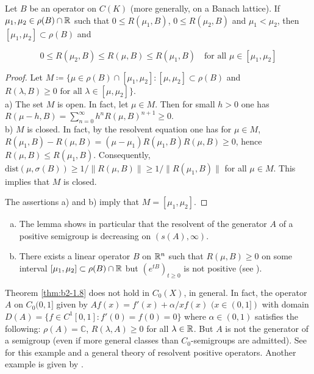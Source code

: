 \begin{lemma}\label{lem:b2-1.9}
Let $B$ be an operator on $C(K)$ (more generally, on a Banach lattice).
If $\mu_{1}, \mu_{2} \in \rho(B) \cap \mathbb{R}$ such that $0 \leq R(\mu_{1},B)$, $0 \leq R(\mu_{2},B)$ and $\mu_{1} < \mu_{2}$, then $[\mu_{1},\mu_{2}] \subset \rho(B)$ and

\[
    0 \leq R(\mu_{2},B) \leq R(\mu,B) \leq R(\mu_{1},B) \quad \text{for all } \mu \in [\mu_{1},\mu_{2}]
\]
\end{lemma}
\begin{proof}
Let $M \coloneqq \{\mu \in \rho(B) \cap [\mu_{1},\mu_{2}] \colon [\mu,\mu_{2}] \subset \rho(B)$  and $R(\lambda,B) \geq 0 \text{ for all } \lambda \in [\mu,\mu_{2}]\}$.
\\
a) The set $M$ is open.
In fact, let $\mu \in M$.
Then for small $h > 0$ one has $R(\mu-h,B) = \sum_{n=0}^{\infty} h^{n}R(\mu,B)^{n+1} \geq 0$.
\\
b) $M$ is closed.
In fact, by the resolvent equation one has for $\mu \in M$, $R(\mu_{1},B) - R(\mu,B) = (\mu - \mu_{1})R(\mu_{1},B)R(\mu,B) \geq 0$, hence $R(\mu,B) \leq R(\mu_{1},B)$.
Consequently, $\text{dist}(\mu,\sigma(B)) \geq 1/\|R(\mu,B)\| \geq 1/\|R(\mu_{1},B)\|$ for all $\mu \in M$.
This implies that $M$ is closed.

The assertions a) and b) imply that $M = [\mu_{1},\mu_{2}]$.
\end{proof}
\begin{remark*}\label{rem:b2-1.9-kgk1}
\begin{enumerate}[a), wide, labelsep=1em, itemindent=\parindent]
\item \label{rem:b2-1.9-1}
The lemma shows in particular that the resolvent of the generator $A$ of a positive semigroup is decreasing on $(s(A),\infty)$.

\item \label{rem:b2-1.9-2}
There exists a linear operator $B$ on $\mathbb{R}^{n}$ such that $R(\mu,B) \geq 0$ on some interval $[\mu_{1},\mu_{2}] \subset \rho(B) \cap \mathbb{R}$ but $(e^{tB})_{t \geq 0}$ is not positive (see \citet{greinervoigtwolff:1981}
).
\end{enumerate}
\end{remark*}

\begin{remark*}\label{rem:b2-1.9-kgk2}
Theorem \ref{thm:b2-1.8} does not hold in $C_{0}(X)$, in general.
In fact, the operator $A$ on $C_{0}(0,1]$ given by $Af(x) = f'(x) + \alpha/x f(x)$ $(x \in (0,1])$ with domain $D(A) = \{f \in C^{1}[0,1] \colon f'(0) = f(0) = 0\}$ where $\alpha \in (0,1)$ satisfies the following: $\rho(A) = \mathbb{C}$, $R(\lambda,A) \geq 0$ for all $\lambda \in \mathbb{R}$.
But $A$ is not the generator of a semigroup (even if more general classes than $C_{0}$-semigroups are admitted).
See \citet{Arendt:1985b} for this example and a general theory of resolvent positive operators.
Another example is given by \citet{battydavies:1983}.
\end{remark*}

